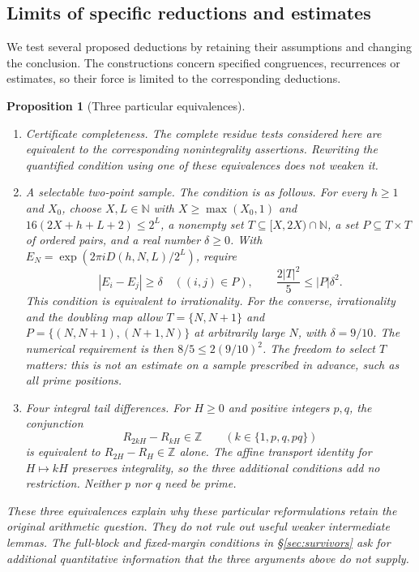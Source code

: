 \documentclass[11pt]{article}
\theoremstyle{plain}
\newtheorem{prop}[thm]{Proposition}
\theoremstyle{definition}
\theoremstyle{remark}
\newcommand{\N}{\mathbb{N}}
\newcommand{\Z}{\mathbb{Z}}
\begin{document}
\subsection{Limits of specific reductions and estimates}

We test several proposed deductions by retaining their assumptions
and changing the conclusion. The constructions concern specified
congruences, recurrences or estimates, so their force is limited to
the corresponding deductions.


\begin{prop}[Three particular equivalences]
\label{prop:b2}
\begin{enumerate}[label=(\alph*),leftmargin=*]
\item \emph{Certificate completeness.} The complete residue tests considered here are
  equivalent to the corresponding nonintegrality assertions. Rewriting the
  quantified condition using one of these equivalences does not weaken it.
\item \emph{A selectable two-point sample.} The condition is as follows.
  For every $h\ge1$ and $X_0$, choose $X,L\in\N$ with
  $X\ge\max(X_0,1)$ and $16(2X+h+L+2)\le2^L$, a nonempty set
  $T\subseteq[X,2X)\cap\N$, a set $P\subseteq T\times T$ of ordered
  pairs, and a real number $\delta\ge0$. With
  $E_N=\exp(2\pi iD(h,N,L)/2^L)$, require
  \[
   |E_i-E_j|\ge\delta\quad((i,j)\in P),\qquad
   \frac{2|T|^2}{5}\le |P|\delta^2.
  \]
  This condition is equivalent to irrationality. For the converse,
  irrationality and the doubling map allow
  $T=\{N,N+1\}$ and $P=\{(N,N+1),(N+1,N)\}$ at arbitrarily large $N$,
  with $\delta=9/10$. The numerical requirement is then
  $8/5\le2(9/10)^2$. The freedom to select $T$ matters: this is not an
  estimate on a sample prescribed in advance, such as all prime positions.

\item \emph{Four integral tail differences.} For $H\ge0$ and positive
  integers $p,q$, the conjunction
  \[
   R_{2kH}-R_{kH}\in\Z\qquad(k\in\{1,p,q,pq\})
  \]
  is equivalent to $R_{2H}-R_H\in\Z$ alone. The affine transport identity
  for $H\mapsto kH$ preserves integrality, so the three additional
  conditions add no restriction. Neither $p$ nor $q$ need be prime.
\end{enumerate}
These three equivalences explain why these particular reformulations
retain the original arithmetic question. They do not rule out useful weaker
intermediate lemmas. The full-block and fixed-margin conditions in
\S\ref{sec:survivors} ask for additional quantitative information that the
three arguments above do not supply.
\end{prop}
\end{document}

